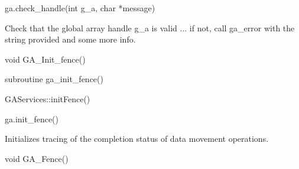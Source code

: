 \documentclass[10pt]{article}
\begin{document}
\begin{pyapi}
\begin{pycode}
ga.check_handle(int g_a, char *message)
\end{pycode}
\begin{funcargs}
\end{funcargs}
\end{pyapi}

\local

\begin{desc}

Check that the global array handle g_a is valid ... if not, call ga_error with
the string provided and some more info.

\end{desc}


\begin{capi}
\begin{ccode}
void GA_Init_fence()
\end{ccode}
\end{capi}

\begin{fapi}
\begin{fcode}
subroutine ga_init_fence()
\end{fcode}
\end{fapi}

\begin{cxxapi}
\begin{cxxcode}
GAServices::initFence()
\end{cxxcode}
\end{cxxapi}

\begin{pyapi}
\begin{pycode}
ga.init_fence()
\end{pycode}
\end{pyapi}

\local

\begin{desc}

Initializes tracing of the completion status of data movement operations.

\end{desc}


\begin{capi}
\begin{ccode}
void GA_Fence()
\end{ccode}
\end{capi}
\end{document}
